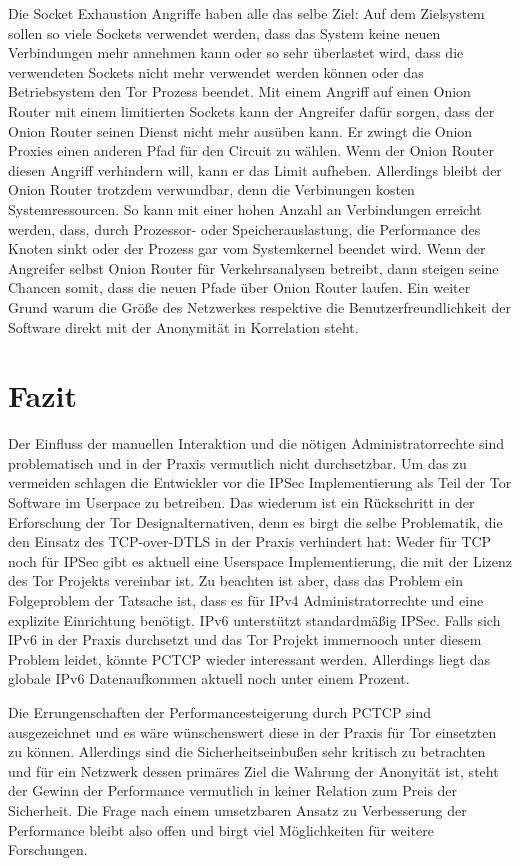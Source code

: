 \documentclass[fleqn,envcountsame,runningheads,10pt,a4paper]{llncs}
\begin{document}
Die Socket Exhaustion Angriffe haben alle das selbe Ziel: Auf dem Zielsystem sollen so viele Sockets verwendet werden, dass das System keine neuen Verbindungen mehr annehmen kann oder so sehr überlastet wird, dass die verwendeten Sockets nicht mehr verwendet werden können oder das Betriebsystem den Tor Prozess beendet. Mit einem Angriff auf einen Onion Router mit einem limitierten Sockets kann der Angreifer dafür sorgen, dass der Onion Router seinen Dienst nicht mehr ausüben kann. Er zwingt die Onion Proxies einen anderen Pfad für den Circuit zu wählen. Wenn der Onion Router diesen Angriff verhindern will, kann er das Limit aufheben. Allerdings bleibt der Onion Router trotzdem verwundbar, denn die Verbinungen kosten  Systemressourcen. So kann mit einer hohen Anzahl an Verbindungen erreicht werden, dass, durch Prozessor- oder Speicherauslastung, die Performance des Knoten sinkt oder der Prozess gar vom Systemkernel beendet wird. Wenn der Angreifer selbst Onion Router für Verkehrsanalysen betreibt, dann steigen seine Chancen somit, dass die neuen Pfade über Onion Router laufen. Ein weiter Grund warum die Größe des Netzwerkes respektive die Benutzerfreundlichkeit der Software direkt mit der Anonymität in Korrelation steht.

\section{Fazit}

Der Einfluss der manuellen Interaktion und die nötigen Administratorrechte sind problematisch und in der Praxis vermutlich nicht durchsetzbar. Um das zu vermeiden schlagen die Entwickler vor die IPSec Implementierung als Teil der Tor Software im Userpace zu betreiben. Das wiederum ist ein Rückschritt in der Erforschung der Tor Designalternativen, denn es birgt die selbe Problematik, die den Einsatz des TCP-over-DTLS in der Praxis verhindert hat: Weder für TCP noch für IPSec gibt es aktuell eine Userspace Implementierung, die mit der Lizenz des Tor Projekts vereinbar ist. Zu beachten ist aber, dass das Problem ein Folgeproblem der Tatsache ist, dass es für IPv4 Administratorrechte und eine explizite Einrichtung benötigt. IPv6 unterstützt standardmäßig IPSec. Falls sich IPv6 in der Praxis durchsetzt und das Tor Projekt immernooch unter diesem Problem leidet, könnte PCTCP wieder interessant werden. Allerdings liegt das globale IPv6 Datenaufkommen aktuell noch unter einem Prozent.

Die Errungenschaften der Performancesteigerung durch PCTCP sind ausgezeichnet und es wäre wünschenswert diese in der Praxis für Tor einsetzten zu können. Allerdings sind die Sicherheitseinbußen sehr kritisch zu betrachten und für ein Netzwerk dessen primäres Ziel die Wahrung der Anonyität ist, steht der Gewinn der Performance vermutlich in keiner Relation zum Preis der Sicherheit. Die Frage nach einem umsetzbaren Ansatz zu Verbesserung der Performance bleibt also offen und birgt viel Möglichkeiten für weitere Forschungen.










\end{document}
